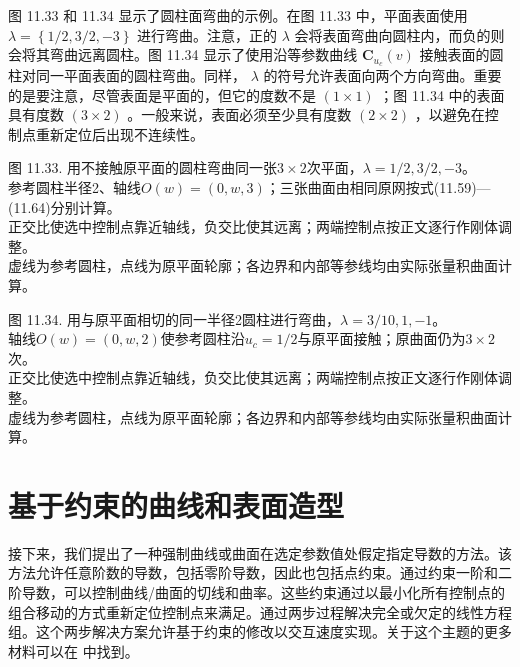 \documentclass[../main.tex]{subfiles}
\begin{document}
图 11.33 和 11.34 显示了圆柱面弯曲的示例。在图 11.33 中，平面表面使用 \(\lambda  = \left\{  {1/2,3/2, - 3}\right\}\) 进行弯曲。注意，正的 \(\lambda\) 会将表面弯曲向圆柱内，而负的则会将其弯曲远离圆柱。图 11.34 显示了使用沿等参数曲线 \({\mathbf{C}}_{{u}_{c}}\left( v\right)\) 接触表面的圆柱对同一平面表面的圆柱弯曲。同样， \(\lambda\) 的符号允许表面向两个方向弯曲。重要的是要注意，尽管表面是平面的，但它的度数不是 \(\left( {1 \times  1}\right)\) ；图 11.34 中的表面具有度数 \(\left( {3 \times  2}\right)\) 。一般来说，表面必须至少具有度数 \(\left( {2 \times  2}\right)\) ，以避免在控制点重新定位后出现不连续性。

\begin{center}
\begin{minipage}{26cm}
\centering
{}
\par\smallskip
图 11.33. 用不接触原平面的圆柱弯曲同一张$3\times2$次平面，$\lambda=1/2,3/2,-3$。\\
参考圆柱半径2、轴线$O(w)=(0,w,3)$；三张曲面由相同原网按式(11.59)—(11.64)分别计算。\\
正交比使选中控制点靠近轴线，负交比使其远离；两端控制点按正文逐行作刚体调整。\\
虚线为参考圆柱，点线为原平面轮廓；各边界和内部等参线均由实际张量积曲面计算。
\end{minipage}
\end{center}

\begin{center}
\begin{minipage}{26cm}
\centering
{}
\par\smallskip
图 11.34. 用与原平面相切的同一半径2圆柱进行弯曲，$\lambda=3/10,1,-1$。\\
轴线$O(w)=(0,w,2)$使参考圆柱沿$u_c=1/2$与原平面接触；原曲面仍为$3\times2$次。\\
正交比使选中控制点靠近轴线，负交比使其远离；两端控制点按正文逐行作刚体调整。\\
虚线为参考圆柱，点线为原平面轮廓；各边界和内部等参线均由实际张量积曲面计算。
\end{minipage}
\end{center}


\section{基于约束的曲线和表面造型}

接下来，我们提出了一种强制曲线或曲面在选定参数值处假定指定导数的方法。该方法允许任意阶数的导数，包括零阶导数，因此也包括点约束。通过约束一阶和二阶导数，可以控制曲线/曲面的切线和曲率。这些约束通过以最小化所有控制点的组合移动的方式重新定位控制点来满足。通过两步过程解决完全或欠定的线性方程组。这个两步解决方案允许基于约束的修改以交互速度实现。关于这个主题的更多材料可以在 \cite{Fowl92,Fowl93} 中找到。
\end{document}

